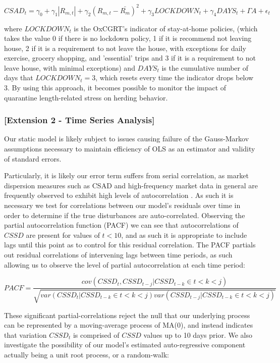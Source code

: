\documentclass[12pt]{article}
\numberwithin{table}{section}   %
\begin{document}
\begin{equation}\label{model-4}
CSAD_t=\gamma_0+\gamma_1 |R_{m,t}|+\gamma_2 (R_{m,t}-\bar{R_m})^2+\gamma_3LOCKDOWN_t+\gamma_4DAYS_t+\Gamma{A}+\epsilon_t
\end{equation}

where $LOCKDOWN_t$ is the OxCGRT's indicator of stay-at-home policies, (which takes the value 0 if there is no lockdown policy, 1 if it is recommend not leaving house, 2 if it is a requirement to not leave the house, with exceptions for daily exercise, grocery shopping, and 'essential' trips and 3 if it is a requirement to not leave house, with minimal exceptions) and $DAYS_t$ is the cumulative number of days that $LOCKDOWN_t = 3$, which resets every time the indicator drops below 3. By using this approach, it becomes possible to monitor the impact of quarantine length-related stress \citep{brooks} on herding behavior.

\subsubsection*{[Extension 2 - Time Series Analysis]}

Our static model is likely subject to issues causing failure of the Gauss-Markov assumptions necessary to maintain efficiency of OLS as an estimator and validity of standard errors. 

Particularly, it is likely our error term suffers from serial correlation, as market dispersion measures such as CSAD and high-frequency market data in general are frequently observed to exhibit high levels of autocorrelation \citep{cck}. As such it is necessary we test for correlations between our model’s residuals over time in order to determine if the true disturbances are auto-correlated. Observing the partial autocorrelation function (PACF) we can see that autocorrelations of $CSSD$ are present for values of $t<10$, and as such it is appropriate to include lags until this point as to control for this residual correlation. The PACF partials out residual correlations of intervening lags between time periods, as such allowing us to observe the level of partial autocorrelation at each time period:

$$
PACF=\frac{cov(CSSD_t,CSSD_{t-j}|CSSD_{t-k}\in{t<k<j})}{\sqrt{var(CSSD_t|CSSD_{t-k}\in{t<k<j})var(CSSD_{t-j}|CSSD_{t-k}\in{t<k<j})}}
$$

These significant partial-correlations reject the null that our underlying process can be represented by a moving-average process of MA(0), and instead indicates that variation $CSSD_t$ is comprised of $CSSD$ values up to 10 days prior. We also investigate the possibility of our model’s estimated auto-regressive component actually being a unit root process, or a random-walk:
\end{document}
